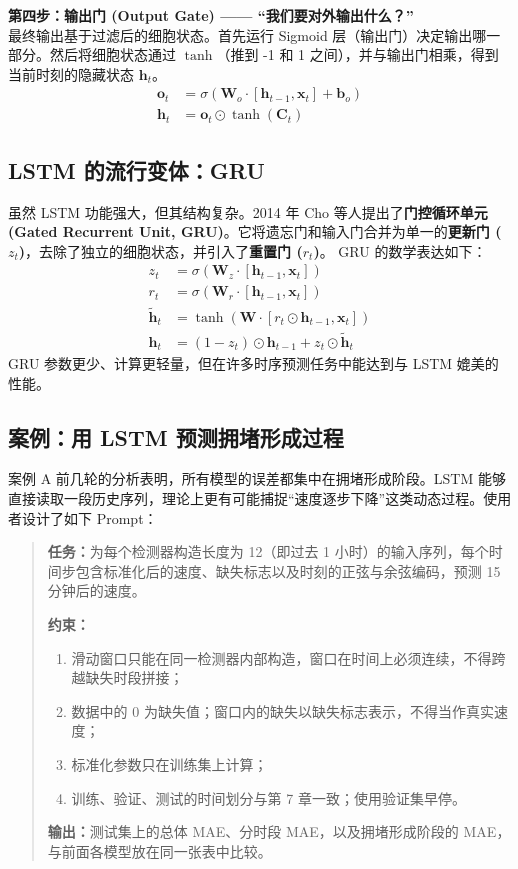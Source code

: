 \textbf{第四步：输出门 (Output Gate) —— “我们要对外输出什么？”} \\
最终输出基于过滤后的细胞状态。首先运行 Sigmoid 层（输出门）决定输出哪一部分。然后将细胞状态通过 $\tanh$（推到 -1 和 1 之间），并与输出门相乘，得到当前时刻的隐藏状态 $\mathbf{h}_t$。
\begin{align}
    \mathbf{o}_t &= \sigma(\mathbf{W}_o \cdot [\mathbf{h}_{t-1}, \mathbf{x}_t] + \mathbf{b}_o) \\
    \mathbf{h}_t &= \mathbf{o}_t \odot \tanh(\mathbf{C}_t)
\end{align}

\subsection{LSTM 的流行变体：GRU}
虽然 LSTM 功能强大，但其结构复杂。2014 年 Cho 等人提出了\textbf{门控循环单元 (Gated Recurrent Unit, GRU)}。它将遗忘门和输入门合并为单一的\textbf{更新门 ($z_t$)}，去除了独立的细胞状态，并引入了\textbf{重置门 ($r_t$)}。
GRU 的数学表达如下：
\begin{align}
    z_t &= \sigma(\mathbf{W}_z \cdot [\mathbf{h}_{t-1}, \mathbf{x}_t]) \\
    r_t &= \sigma(\mathbf{W}_r \cdot [\mathbf{h}_{t-1}, \mathbf{x}_t]) \\
    \tilde{\mathbf{h}}_t &= \tanh(\mathbf{W} \cdot [r_t \odot \mathbf{h}_{t-1}, \mathbf{x}_t]) \\
    \mathbf{h}_t &= (1 - z_t) \odot \mathbf{h}_{t-1} + z_t \odot \tilde{\mathbf{h}}_t
\end{align}
GRU 参数更少、计算更轻量，但在许多时序预测任务中能达到与 LSTM 媲美的性能。

\subsection{案例：用 LSTM 预测拥堵形成过程}

案例 A 前几轮的分析表明，所有模型的误差都集中在拥堵形成阶段。LSTM 能够直接读取一段历史序列，理论上更有可能捕捉“速度逐步下降”这类动态过程。使用者设计了如下 Prompt：

\begin{quote}
\textbf{任务：}为每个检测器构造长度为 12（即过去 1 小时）的输入序列，每个时间步包含标准化后的速度、缺失标志以及时刻的正弦与余弦编码，预测 15 分钟后的速度。

\textbf{约束：}
\begin{enumerate}
  \item 滑动窗口只能在同一检测器内部构造，窗口在时间上必须连续，不得跨越缺失时段拼接；
  \item 数据中的 0 为缺失值；窗口内的缺失以缺失标志表示，不得当作真实速度；
  \item 标准化参数只在训练集上计算；
  \item 训练、验证、测试的时间划分与第 7 章一致；使用验证集早停。
\end{enumerate}

\textbf{输出：}测试集上的总体 MAE、分时段 MAE，以及拥堵形成阶段的 MAE，与前面各模型放在同一张表中比较。
\end{quote}

